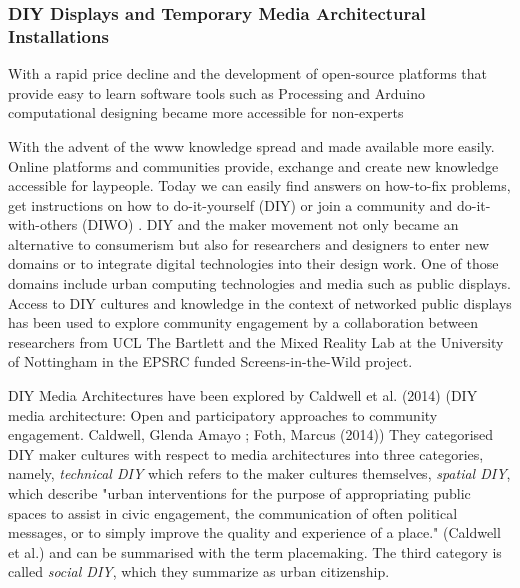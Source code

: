 



\subsubsection{DIY Displays and Temporary Media Architectural Installations}

With a rapid price decline and the development of open-source platforms that provide easy to learn software tools such as Processing and Arduino computational designing became more accessible for non-experts 

With the advent of the www knowledge spread and made available more easily. Online platforms and communities provide, exchange and create new knowledge accessible for laypeople. Today we can easily find answers on how-to-fix problems, get instructions on how to do-it-yourself (DIY)  or join a community and do-it-with-others (DIWO) . DIY and the maker movement not only became an alternative to consumerism but also for researchers and designers to enter new domains or to integrate digital technologies into their design work.  
One of those domains include urban computing technologies and media such as public displays. 
Access to DIY cultures and knowledge in the context of networked public displays has been used to explore community engagement by a collaboration between researchers from UCL The Bartlett and the Mixed Reality Lab at the University of Nottingham in the EPSRC funded Screens-in-the-Wild  project. 

DIY Media Architectures have been explored by Caldwell et al. (2014) (DIY media architecture: Open and participatory approaches to community engagement. Caldwell, Glenda Amayo ; Foth, Marcus (2014)) 
They categorised DIY maker cultures with respect to media architectures into three categories, namely, \textit{technical DIY} which refers to the maker cultures themselves, \textit{spatial DIY}, which describe "urban interventions for the purpose of appropriating public spaces to assist in civic engagement, the communication of often political messages, or to simply improve the quality and experience of a place." (Caldwell et al.) and can be summarised with the term placemaking. The third category is called \textit{social DIY}, which they summarize as urban citizenship.

